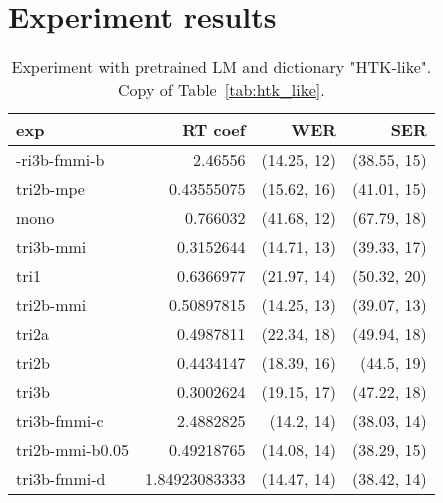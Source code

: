 \chapter{Experiment results}
\label{cha:results}

\begin{table}[!htp]\label{tab:htk_like_copy}\centering\begin{tabular}{l|rrr}
exp             & RT coef       & WER         & SER        \\ 
\hline
-ri3b-fmmi-b    & 2.46556       & (14.25, 12) & (38.55, 15)\\ 
tri2b-mpe       & 0.43555075    & (15.62, 16) & (41.01, 15)\\ 
mono            & 0.766032      & (41.68, 12) & (67.79, 18)\\ 
tri3b-mmi       & 0.3152644     & (14.71, 13) & (39.33, 17)\\ 
tri1            & 0.6366977     & (21.97, 14) & (50.32, 20)\\ 
tri2b-mmi       & 0.50897815    & (14.25, 13) & (39.07, 13)\\ 
tri2a           & 0.4987811     & (22.34, 18) & (49.94, 18)\\ 
tri2b           & 0.4434147     & (18.39, 16) & (44.5, 19) \\ 
tri3b           & 0.3002624     & (19.15, 17) & (47.22, 18)\\ 
tri3b-fmmi-c    & 2.4882825     & (14.2, 14)  & (38.03, 14)\\ 
tri2b-mmi-b0.05 & 0.49218765    & (14.08, 14) & (38.29, 15)\\ 
tri3b-fmmi-d    & 1.84923083333 & (14.47, 14) & (38.42, 14)
\end{tabular}
\caption{Experiment with pretrained LM and dictionary "\ac{HTK}-like". Copy of Table~\ref{tab:htk_like}.}
\end{table}  

